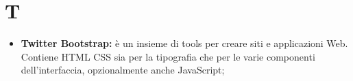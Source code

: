 \section*{T} %
\label{sec:t}
	\begin{itemize}
		\item \textbf{Twitter Bootstrap:} è un insieme di tools per creare siti e applicazioni Web. Contiene HTML CSS sia per la tipografia che per le varie componenti dell'interfaccia, opzionalmente anche JavaScript;
	\end{itemize}
\pagebreak
